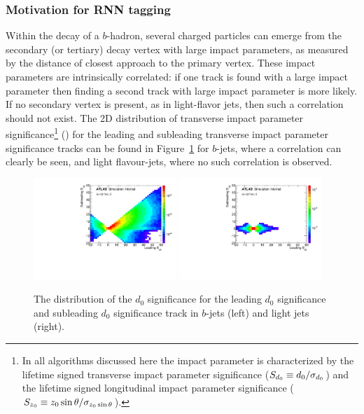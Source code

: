 \subsubsection{Motivation for RNN tagging}

Within the decay of a $b$-hadron, several charged particles can emerge from the secondary (or tertiary) decay vertex with large impact parameters, as measured by the distance of closest approach to the primary vertex. These impact parameters are intrinsically correlated: if one track is found with a large impact parameter then finding a second track with large impact parameter is more likely. If no secondary vertex is present, as in light-flavor jets, then such a correlation should not exist. The 2D distribution of transverse impact parameter significance\footnote{In all algorithms discussed here the impact parameter is characterized by the lifetime signed transverse impact parameter significance ($S_{d{_0}} \equiv d_0 / \sigma_{d_0}$) and the lifetime signed longitudinal impact parameter significance ($S_{z{_0}} \equiv z_0 \sin \theta / \sigma_{z_0 \sin \theta}$).} (\sdip) for the leading and subleading transverse impact parameter significance tracks can be found in Figure~\ref{fig:ip_corr} for $b$-jets, where a correlation can clearly be seen, and light flavour-jets, where no such correlation is observed.
\begin{figure}[htbp]
  \centering
   \includegraphics[width=0.48\textwidth]{figures/RNN/Sd0_2d_B.pdf}
 \includegraphics[width=0.48\textwidth]{figures/RNN/Sd0_2d_L.pdf}
\caption{The distribution of the $d_0$ significance for the leading $d_0$ significance and subleading $d_0$ significance track in $b$-jets (left) and light jets (right). }
  \label{fig:ip_corr}
\end{figure}


